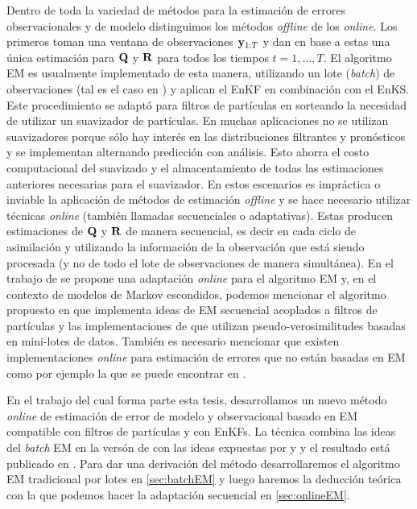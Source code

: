 Dentro de toda la variedad de métodos para la estimación de errores observacionales y de modelo distinguimos los métodos \textit{offline} de los \textit{online}. Los primeros toman una ventana de observaciones $\mathbf{y}_{1:T}$ y dan en base a estas una única estimación para $\mathbf{Q}$ y $\mathbf{R}$ para todos los tiempos $t = 1, ..., T$. El algoritmo EM es usualmente implementado de esta manera, utilizando un lote (\textit{batch}) de observaciones (tal es el caso en \cite{Dreano2017, Tandeo2015, Pulido2018}) y aplican el EnKF en combinación con el EnKS. Este procedimiento se adaptó para filtros de partículas en \cite{Lucini2021} sorteando la necesidad de utilizar un suavizador de partículas. En muchas aplicaciones no se utilizan suavizadores porque sólo hay interés en las distribuciones filtrantes y pronósticos y se implementan alternando predicción con análisis. Esto ahorra el costo computacional del suavizado y el almacentamiento de todas las estimaciones anteriores necesarias para el suavizador. En estos escenarios es impráctica o inviable la aplicación de métodos de estimación \textit{offline} y se hace necesario utilizar técnicas \textit{online} (también llamadas secuenciales o adaptativas). Estas producen estimaciones de $\mathbf{Q}$ y $\mathbf{R}$ de manera secuencial, es decir en cada ciclo de asimilación y utilizando la información de la observación que está siendo procesada (y no de todo el lote de observaciones de manera simultánea). En el trabajo de \cite{Neal1998} se propone una adaptación \textit{online} para el algoritmo EM y, en el contexto de modelos de Markov escondidos, podemos mencionar el algoritmo propuesto en \cite{Cappe2009} que implementa ideas de EM secuencial acoplados a filtros de partículas y las implementaciones de \cite{Andrieu2003} que utilizan pseudo-verosimilitudes basadas en mini-lotes de datos. También es necesario mencionar que existen implementaciones \textit{online} para estimación de errores que no están basadas en EM como por ejemplo la que se puede encontrar en \cite{Berry2013}.

En el trabajo del cual forma parte esta tesis, desarrollamos un nuevo método \textit{online} de estimación de error de modelo y observacional basado en EM compatible con filtros de partículas y con EnKFs. La técnica combina las ideas del \textit{batch} EM en la versón de \cite{Dreano2017} con las ideas expuestas por \cite{Cappe2009} y \cite{Andrieu2003} y el resultado está publicado en \cite{Cocucci2021}. Para dar una derivación del método desarrollaremos el algoritmo EM tradicional por lotes en \ref{sec:batchEM} y luego haremos la deducción teórica con la que podemos hacer la adaptación secuencial en \ref{sec:onlineEM}. 

